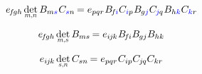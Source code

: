 \begin{otherlanguage}{russian}
\[
e_{\hspace{-0.25ex}f\hspace{-0.2ex}gh} \hspace{.33ex} \underset{\raisebox{.15em}{\scalebox{.7}{$m$,$n$}}}{\operatorname{det}} \, B_{m\mathcolor{blue}{s}} \hspace{.1ex} C_{\mathcolor{blue}{s}n} \hspace{-0.2ex}
= e_{pqr} \hspace{.1ex} B_{\hspace{-0.25ex}f\hspace{-0.1ex}\mathcolor{blue}{i}} C_{\mathcolor{blue}{i}p} \hspace{.1ex} B_{\hspace{-0.1ex}g\mathcolor{blue}{j}} C_{\hspace{-0.1ex}\mathcolor{blue}{j}\hspace{-0.1ex}q} \hspace{.1ex} B_{h\mathcolor{blue}{k}} C_{\mathcolor{blue}{k}r}
\hspace{-0.2ex}
\]

\[
e_{\hspace{-0.25ex}f\hspace{-0.2ex}gh} \hspace{.33ex} \underset{\raisebox{.15em}{\scalebox{.7}{$m$,$s$}}}{\operatorname{det}} \, B_{ms} \hspace{-0.2ex}
= e_{i\hspace{-0.1ex}j\hspace{-0.1ex}k} \hspace{.1ex} B_{\hspace{-0.25ex}f\hspace{-0.1ex}i} B_{\hspace{-0.1ex}gj} B_{hk}
\hspace{-0.2ex}
\]

\[
e_{i\hspace{-0.1ex}j\hspace{-0.1ex}k} \hspace{.33ex} \underset{\raisebox{.15em}{\scalebox{.7}{$s$,$n$}}}{\operatorname{det}} \, C_{sn} \hspace{-0.2ex}
= e_{pqr} \hspace{.1ex} C_{ip} C_{\hspace{-0.1ex}j\hspace{-0.1ex}q} C_{kr}
\hspace{-0.2ex}
\]


\end{otherlanguage}
